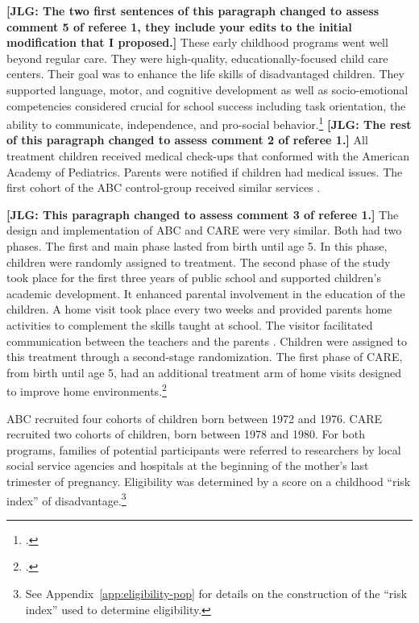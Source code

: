 \textbf{[JLG: The two first sentences of this paragraph changed to assess comment 5 of referee 1, they include your edits to the initial modification that I proposed.]} These early childhood programs went well beyond regular care. They were high-quality, educationally-focused child care centers. Their goal was to enhance the life skills of disadvantaged children. They supported language, motor, and cognitive development as well as socio-emotional competencies considered crucial for school success including task orientation, the ability to communicate, independence, and pro-social behavior.\footnote{\citet{Sparling_1974_Synth_Edu_Infant_SPEECH, Ramey_Collier_etal_1976_CarolinaAbecedarianProject, Ramey_etal_1985_Project-CARE_TiECSE, Wasik_Ramey_etal_1990_CD, Ramey-etal_2012-ABC}.} \textbf{[JLG: The rest of this paragraph changed to assess comment 2 of referee 1.]} All treatment children received medical check-ups that conformed with the American Academy of Pediatrics. Parents were notified if children had medical issues. The first cohort of the ABC control-group received similar services \citep{Campbell_Conti_etal_2014_EarlyChildhoodInvestments,Henderson-et-al_1982_NEJoM}.

\textbf{[JLG: This paragraph changed to assess comment 3 of referee 1.]} The design and implementation of ABC and CARE were very similar. Both had two phases. The first and main phase lasted from birth until age 5. In this phase, children were randomly assigned to treatment. The second phase of the study took place for the first three years of public school and supported children's academic development. It enhanced parental involvement in the education of the children. A home visit took place every two weeks and provided parents home activities to complement the skills taught at school. The visitor facilitated communication between the teachers and the parents \citep{Campbell_Ramey_1995_AERJ}. Children were assigned to this treatment through a second-stage randomization. The first phase of CARE, from birth until age 5, had an additional treatment arm of home visits designed to improve home environments.\footnote{\citet{Wasik_Ramey_etal_1990_CD}.}

ABC recruited four cohorts of children born between 1972 and 1976. CARE recruited two cohorts of children, born between 1978 and 1980. For both programs, families of potential participants were referred to researchers by local social service agencies and hospitals at the beginning of the mother's last trimester of pregnancy. Eligibility was determined by a score on a childhood ``risk index'' of disadvantage.\footnote{See  Appendix~\ref{app:eligibility-pop} for details on the construction of the ``risk index'' used to determine eligibility.}

